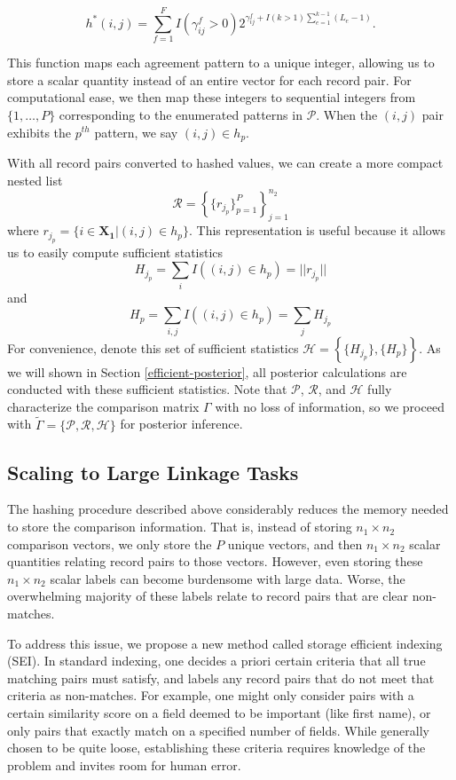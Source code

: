 \documentclass[ba]{imsart}
\begin{document}
$$h^{*}(i, j) = \sum_{f = 1}^F I(\gamma_{ij}^f > 0)2^{\gamma_{ij}^f + I(k>1)\sum_{e=1}^{k-1}(L_e -1)}.$$

This function maps each agreement pattern to a unique integer, allowing us to store a scalar quantity instead of an entire vector for each record pair. For computational ease, we then map these integers to sequential integers from $\{1, \ldots, P\}$ corresponding to the enumerated patterns in $\mathcal{P}$. When the $(i, j)$ pair exhibits the $p^{th}$ pattern, we say $(i, j) \in h_p$.

With all record pairs converted to hashed values, we can create a more compact nested list 
$$\mathcal{R} = \left\{\{r_{j_p} \}_{p=1}^{P} \right\}_{j = 1}^{n_2}$$
where $r_{j_p} = \{i \in \bm{X_1} | (i, j) \in h_p\}$. This representation is useful because it allows us to easily compute sufficient statistics
$$H_{j_p} = \sum_{i} I((i, j) \in h_p) = ||r_{j_p}||$$
and
$$H_p =  \sum_{i, j} I((i, j) \in h_p) = \sum_{j} H_{j_p}$$
For convenience, denote this set of sufficient statistics $\mathcal{H} = \left\{\{H_{j_p}\}, \{H_{p}\}\right\}.$ As we will shown in Section \ref{efficient-posterior}, all posterior calculations are conducted with these sufficient statistics. Note that $\mathcal{P}$, $\mathcal{R}$, and $\mathcal{H}$  fully characterize the comparison matrix $\Gamma$ with no loss of information, so we proceed with $\tilde{\Gamma} = \{\mathcal{P}, \mathcal{R}, \mathcal{H}\}$ for posterior inference. 

\hypertarget{scaling}{%
	\subsection{Scaling to Large Linkage Tasks}\label{scaling}}

The hashing procedure described above considerably reduces the memory
needed to store the comparison information. That is, instead of storing
\(n_1 \times n_2\) comparison vectors, we only store the
\(P\) unique vectors, and then \(n_1 \times n_2\) scalar quantities
relating record pairs to those vectors. However, even storing these
\(n_1 \times n_2\) scalar labels can become burdensome with large data.
Worse, the overwhelming majority of these labels relate to record pairs
that are clear non-matches.

To address this issue, we propose a new method called storage efficient indexing (SEI). In standard indexing, one decides a priori certain criteria that all true matching pairs must satisfy, 
and labels any record pairs that do not meet that criteria as
non-matches. For example, one might only consider pairs with a certain
similarity score on a field deemed to be important (like first name), or
only pairs that exactly match on a specified number of fields. While
generally chosen to be quite loose, establishing these criteria
requires knowledge of the problem and invites room for human error. 
\end{document}

